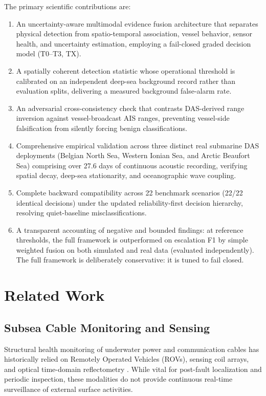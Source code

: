 \documentclass[conference]{IEEEtran}
\newcommand{\dstate}[1]{\ensuremath{\mathrm{#1}}}
\begin{document}
The primary scientific contributions are:
\begin{enumerate}
\item An uncertainty-aware multimodal evidence fusion architecture that
separates physical detection from spatio-temporal association, vessel behavior,
sensor health, and uncertainty estimation, employing a fail-closed graded
decision model (\dstate{T0}--\dstate{T3}, \dstate{TX}).
\item A spatially coherent detection statistic whose operational threshold is
calibrated on an independent deep-sea background record rather than evaluation
splits, delivering a measured background false-alarm rate.
\item An adversarial cross-consistency check that contrasts DAS-derived range
inversion against vessel-broadcast AIS ranges, preventing vessel-side
falsification from silently forcing benign classifications.
\item Comprehensive empirical validation across three distinct real submarine
DAS deployments (Belgian North Sea, Western Ionian Sea, and Arctic Beaufort
Sea) comprising over 27.6 days of continuous acoustic recording, verifying
spatial decay, deep-sea stationarity, and oceanographic wave coupling.
\item Complete backward compatibility across 22 benchmark scenarios (22/22
identical decisions) under the updated reliability-first decision hierarchy,
resolving quiet-baseline misclassifications.
\item A transparent accounting of negative and bounded findings: at reference
thresholds, the full framework is outperformed on escalation F1 by simple
weighted fusion on both simulated and real data (evaluated independently).
The full framework is deliberately conservative: it is tuned to fail closed.
\end{enumerate}

\section{Related Work}

\subsection{Subsea Cable Monitoring and Sensing}
Structural health monitoring of underwater power and communication cables has
historically relied on Remotely Operated Vehicles (ROVs), sensing coil arrays,
and optical time-domain reflectometry \cite{b1,b2,b3,b4}. While vital for
post-fault localization and periodic inspection, these modalities do not provide
continuous real-time surveillance of external surface activities.
\end{document}
